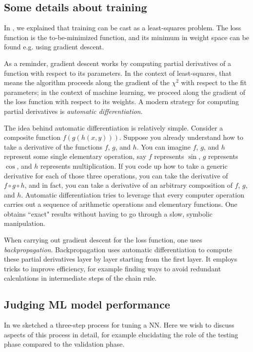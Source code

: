 \subsection{Some details about training}

In , we explained that training can be cast as a least-squares
problem. The loss function is the to-be-minimized function, and its minimum
in weight space can be found e.g. using gradient descent.

As a reminder, gradient descent works by computing partial derivatives of 
a function with respect to its parameters. In the context of least-squares, that
means the algorithm proceeds along the gradient of the $\chi^2$ with respect
to the fit parameters; in the context of machine learning, we proceed along the
gradient of the loss function with respect to its weights. A modern strategy for
computing partial derivatives is {\it automatic differentiation}.

The idea behind automatic differentiation is relatively simple. Consider a composite
function $f(g(h(x,y)))$. Suppose you already understand how to take a derivative
of the functions $f$, $g$, and $h$. You can imagine $f$, $g$, and $h$ represent
some single elementary operation, say $f$ represents $\sin$, $g$ represents
$\cos$, and $h$ represents multiplication. If you code up how to take a generic
derivative for each of those three operations, you can take the derivative of
$f\circ g\circ h$, and in fact, you can take a derivative of an arbitrary
composition of $f$, $g$, and $h$. Automatic differentiation tries to leverage
that every computer operation carries out a sequence of arithmetic operations
and elementary functions. One obtains ``exact" results without having to go
through a slow, symbolic manipulation.

When carrying out gradient descent for the loss function, one uses {\it
backpropagation}. Backpropagation uses automatic
differentiation to compute these partial derivatives layer by layer starting
from the first layer. It employs tricks to improve efficiency, for example
finding ways to avoid redundant calculations in intermediate steps of the chain
rule.

\subsection{Judging ML model performance}

In  we sketched a three-step process for tuning a NN.
Here we wish to discuss aspects of this process in detail, for example
elucidating the role of the testing phase compared to the validation phase.

